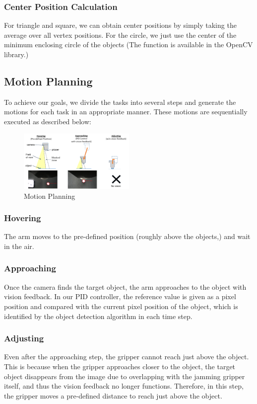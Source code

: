 \documentclass[conference,a4paper]{IEEEtran}
\begin{document}
\subsubsection{Center Position Calculation}
For triangle and square, we can obtain center positions by simply taking the average over all vertex positions. For the circle, we just use the center of the minimum enclosing circle of the objects (The function is available in the OpenCV library.)

\subsection{Motion Planning}

To achieve our goals, we divide the tasks into several steps and generate the motions for each task in an appropriate manner. These motions are sequentially executed as described below:

\begin{figure}[h]
\centering
\includegraphics[width=0.5\textwidth]{MotionPlanning.png}
\caption{Motion Planning}
\label{fig:Motion Planning}
\end{figure}

\subsubsection{Hovering} The arm moves to the pre-defined position (roughly above the objects,) and wait in the air.
\subsubsection{Approaching} Once the camera finds the target object, the arm approaches to the object with vision feedback. In our PID controller, the reference value is given as a pixel position and compared with the current pixel position of the object, which is identified by the object detection algorithm in each time step. 
\subsubsection{Adjusting} Even after the approaching step, the gripper cannot reach just above the object. This is because when the gripper approaches closer to the object, the target object disappears from the image due to overlapping with the jamming gripper itself, and thus the vision feedback no longer functions. Therefore, in this step, the gripper moves a pre-defined distance to reach just above the object.  
\end{document}
